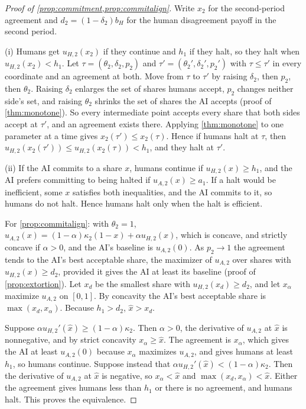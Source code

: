 \documentclass[article, 11pt, reqno]{amsart}
\theoremstyle{named}
\newcommand{\bH}{b_H}
\theoremstyle{plain}
\begin{document}
\begin{proof}[Proof of \cref{prop:commitment,prop:commitalign}]
Write $x_2$ for the second-period agreement and $d_2 = (1-\delta_2)\bH$ for the human disagreement payoff in the second period.

(i) Humans get $u_{H,2}(x_2)$ if they continue and $h_1$ if they halt, so they halt when $u_{H,2}(x_2) < h_1$. Let $\tau = (\theta_2, \delta_2, p_2)$ and $\tau' = (\theta_2', \delta_2', p_2')$ with $\tau \le \tau'$ in every coordinate and an agreement at both. Move from $\tau$ to $\tau'$ by raising $\delta_2$, then $p_2$, then $\theta_2$. Raising $\delta_2$ enlarges the set of shares humans accept, $p_2$ changes neither side's set, and raising $\theta_2$ shrinks the set of shares the AI accepts (proof of \cref{thm:monotone}). So every intermediate point accepts every share that both sides accept at $\tau'$, and an agreement exists there. Applying \cref{thm:monotone} to one parameter at a time gives $x_2(\tau') \le x_2(\tau)$. Hence if humans halt at $\tau$, then $u_{H,2}(x_2(\tau')) \le u_{H,2}(x_2(\tau)) < h_1$, and they halt at $\tau'$.

(ii) If the AI commits to a share $x$, humans continue if $u_{H,2}(x) \ge h_1$, and the AI prefers committing to being halted if $u_{A,2}(x) \ge a_1$. If a halt would be inefficient, some $x$ satisfies both inequalities, and the AI commits to it, so humans do not halt. Hence humans halt only when the halt is efficient.

For \cref{prop:commitalign}: with $\theta_2 = 1$, $u_{A,2}(x) = (1-\alpha)\kappa_2(1-x) + \alpha u_{H,2}(x)$, which is concave, and strictly concave if $\alpha > 0$, and the AI's baseline is $u_{A,2}(0)$. As $p_2 \to 1$ the agreement tends to the AI's best acceptable share, the maximizer of $u_{A,2}$ over shares with $u_{H,2}(x) \ge d_2$, provided it gives the AI at least its baseline (proof of \cref{prop:extortion}). Let $x_d$ be the smallest share with $u_{H,2}(x_d) \ge d_2$, and let $x_\alpha$ maximize $u_{A,2}$ on $[0,1]$. By concavity the AI's best acceptable share is $\max(x_d, x_\alpha)$. Because $h_1 > d_2$, $\hat x > x_d$.

Suppose $\alpha u_{H,2}'(\hat x) \ge (1-\alpha)\kappa_2$. Then $\alpha > 0$, the derivative of $u_{A,2}$ at $\hat x$ is nonnegative, and by strict concavity $x_\alpha \ge \hat x$. The agreement is $x_\alpha$, which gives the AI at least $u_{A,2}(0)$ because $x_\alpha$ maximizes $u_{A,2}$, and gives humans at least $h_1$, so humans continue. Suppose instead that $\alpha u_{H,2}'(\hat x) < (1-\alpha)\kappa_2$. Then the derivative of $u_{A,2}$ at $\hat x$ is negative, so $x_\alpha < \hat x$ and $\max(x_d, x_\alpha) < \hat x$. Either the agreement gives humans less than $h_1$ or there is no agreement, and humans halt. This proves the equivalence.


\end{proof}
\end{document}
